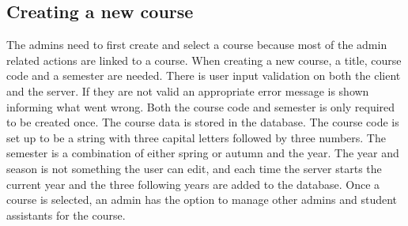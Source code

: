 \subsection{Creating a new course}
The admins need to first create and select a course because most of the admin related actions are linked to a course. When creating a new course, a title, course code and a semester are needed. There is user input validation on both the client and the server. If they are not valid an appropriate error message is shown informing what went wrong. Both the course code and semester is only required to be created once. The course data is stored in the database. The course code is set up to be a string with three capital letters followed by three numbers.  The semester is a combination of either spring or autumn and the year. The year and season is not something the user can edit, and each time the server starts the current year and the three following years are added to the database. Once a course is selected, an admin has the option to manage other admins and student assistants for the course.